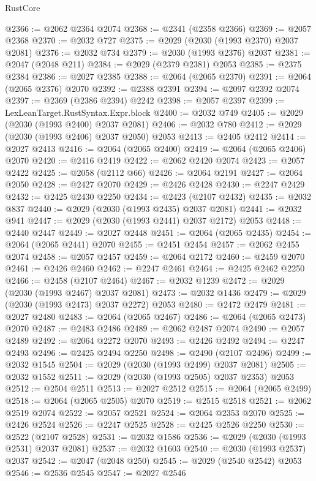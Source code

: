 \begin{lexlean}{RustCore}
\begin{coremodule}
@2366 := @2062 @2364 @2074
@2368 := @2341 (@2358 @2366)
@2369 := @2057 @2368
@2370 := @2032 @727
@2375 := @2029 (@2030 (@1993 @2370) @2037 @2081)
@2376 := @2032 @734
@2379 := @2030 (@1993 @2376) @2037
@2381 := @2047 (@2048 @211)
@2384 := @2029 (@2379 @2381) @2053
@2385 := @2375 @2384
@2386 := @2027 @2385
@2388 := @2064 (@2065 @2370)
@2391 := @2064 (@2065 @2376) @2070
@2392 := @2388 @2391
@2394 := @2097 @2392 @2074
@2397 := @2369 (@2386 @2394) @2242
@2398 := @2057 @2397
@2399 := LexLeanTarget.RustSyntax.Expr.block
@2400 := @2032 @749
@2405 := @2029 (@2030 (@1993 @2400) @2037 @2081)
@2406 := @2032 @780
@2412 := @2029 (@2030 (@1993 @2406) @2037 @2050) @2053
@2413 := @2405 @2412
@2414 := @2027 @2413
@2416 := @2064 (@2065 @2400)
@2419 := @2064 (@2065 @2406) @2070
@2420 := @2416 @2419
@2422 := @2062 @2420 @2074
@2423 := @2057 @2422
@2425 := @2058 (@2112 @66)
@2426 := @2064 @2191
@2427 := @2064 @2050
@2428 := @2427 @2070
@2429 := @2426 @2428
@2430 := @2247 @2429
@2432 := @2425 @2430 @2250
@2434 := @2423 (@2107 @2432)
@2435 := @2032 @837
@2440 := @2029 (@2030 (@1993 @2435) @2037 @2081)
@2441 := @2032 @941
@2447 := @2029 (@2030 (@1993 @2441) @2037 @2172) @2053
@2448 := @2440 @2447
@2449 := @2027 @2448
@2451 := @2064 (@2065 @2435)
@2454 := @2064 (@2065 @2441) @2070
@2455 := @2451 @2454
@2457 := @2062 @2455 @2074
@2458 := @2057 @2457
@2459 := @2064 @2172
@2460 := @2459 @2070
@2461 := @2426 @2460
@2462 := @2247 @2461
@2464 := @2425 @2462 @2250
@2466 := @2458 (@2107 @2464)
@2467 := @2032 @1239
@2472 := @2029 (@2030 (@1993 @2467) @2037 @2081)
@2473 := @2032 @1436
@2479 := @2029 (@2030 (@1993 @2473) @2037 @2272) @2053
@2480 := @2472 @2479
@2481 := @2027 @2480
@2483 := @2064 (@2065 @2467)
@2486 := @2064 (@2065 @2473) @2070
@2487 := @2483 @2486
@2489 := @2062 @2487 @2074
@2490 := @2057 @2489
@2492 := @2064 @2272 @2070
@2493 := @2426 @2492
@2494 := @2247 @2493
@2496 := @2425 @2494 @2250
@2498 := @2490 (@2107 @2496)
@2499 := @2032 @1545
@2504 := @2029 (@2030 (@1993 @2499) @2037 @2081)
@2505 := @2032 @1552
@2511 := @2029 (@2030 (@1993 @2505) @2037 @2353) @2053
@2512 := @2504 @2511
@2513 := @2027 @2512
@2515 := @2064 (@2065 @2499)
@2518 := @2064 (@2065 @2505) @2070
@2519 := @2515 @2518
@2521 := @2062 @2519 @2074
@2522 := @2057 @2521
@2524 := @2064 @2353 @2070
@2525 := @2426 @2524
@2526 := @2247 @2525
@2528 := @2425 @2526 @2250
@2530 := @2522 (@2107 @2528)
@2531 := @2032 @1586
@2536 := @2029 (@2030 (@1993 @2531) @2037 @2081)
@2537 := @2032 @1603
@2540 := @2030 (@1993 @2537) @2037
@2542 := @2047 (@2048 @250)
@2545 := @2029 (@2540 @2542) @2053
@2546 := @2536 @2545
@2547 := @2027 @2546

\end{coremodule}
\end{lexlean}
